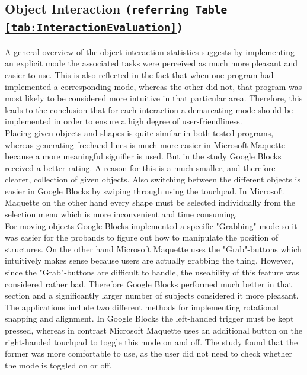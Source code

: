 \documentclass{report}
\begin{document}
		\subsection[Object Interaction]{Object Interaction \small{\texttt{(referring Table \ref{tab:InteractionEvaluation})}}}
		\startsubsection
			A general overview of the object interaction statistics suggests by implementing an explicit mode the associated tasks were perceived as much more pleasant and easier to use. This is also reflected in the fact that when one program had implemented a corresponding mode, whereas the other did not, that program was most likely to be considered more intuitive in that particular area. Therefore, this leads to the conclusion that for each interaction a demarcating mode should be implemented in order to ensure a high degree of user-friendliness. \\
			Placing given objects and shapes is quite similar in both tested programs, whereas generating freehand lines is much more easier in Microsoft Maquette because a more meaningful signifier is used. But in the study Google Blocks received a better rating. A reason for this is a much smaller, and therefore clearer, collection of given objects. Also switching between the different objects is easier in Google Blocks by swiping through using the touchpad. In Microsoft Maquette on the other hand every shape must be selected individually from the selection menu which is more inconvenient and time consuming. \\
			For moving objects Google Blocks implemented a specific "Grabbing"-mode so it was easier for the probands to figure out how to manipulate the position of structures. On the other hand Microsoft Maquette uses the "Grab"-buttons which intuitively makes sense because users are actually grabbing the thing. However, since the "Grab"-buttons are difficult to handle, the useability of this feature was considered rather bad. Therefore Google Blocks performed much better in that section and a significantly larger number of subjects considered it more pleasant. \\
			The applications include two different methods for implementing rotational snapping and alignment. In Google Blocks the left-handed trigger must be kept pressed, whereas in contrast Microsoft Maquette uses an additional button on the right-handed touchpad to toggle this mode on and off. The study found that the former was more comfortable to use, as the user did not need to check whether the mode is toggled on or off. \\
\end{document}
